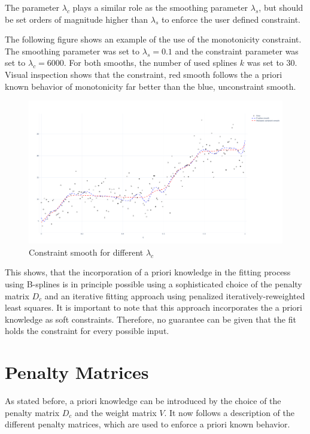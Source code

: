 \documentclass[10pt,a4paper]{article}
\begin{document}
	The parameter $\lambda_c$ plays a similar role as the smoothing parameter $\lambda_s$, but should be set orders of magnitude higher than $\lambda_s$ to enforce the user defined constraint. 
	
	The following figure shows an example of the use of the monotonicity constraint. The smoothing parameter was set to $\lambda_s = 0.1$ and the constraint parameter was set to $\lambda_c = 6000$. For both smooths, the number of used splines $k$ was set to $30$. Visual inspection shows that the constraint, red smooth follows the a priori known behavior of monotonicity far better than the blue, unconstraint smooth.
	
	\begin{figure}[H]
		\centering
		\includegraphics[width=\linewidth]{thesisplots/inc_spline.pdf}
		\caption{Constraint smooth for different $\lambda_c$}
		\label{fig:incspline}
	\end{figure}	

	This shows, that the incorporation of a priori knowledge in the fitting process using B-splines is in principle possible using a sophisticated choice of the penalty matrix $D_c$ and an iterative fitting approach using penalized iteratively-reweighted least squares. It is important to note that this approach incorporates the a priori knowledge as soft constraints. Therefore, no guarantee can be given that the fit holds the constraint for every possible input. 

						
	\section{Penalty Matrices}
	
	
	As stated before, a priori knowledge can be introduced by the choice of the penalty matrix $D_c$ and the weight matrix $V$. It now follows a description of the different penalty matrices, which are used to enforce a priori known behavior. 
	
\end{document}
